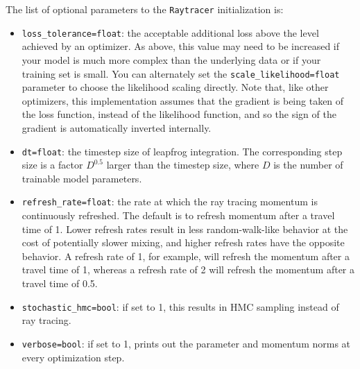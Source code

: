 \documentclass[12pt]{article}
\begin{document}
The list of optional parameters to the \lstinline{Raytracer} initialization is:
\begin{itemize}
\label{optional_parameters}
\item \lstinline{loss_tolerance=float}: the acceptable additional loss above the level achieved by an optimizer.  As above, this value may need to be increased if your model is much more complex than the underlying data or if your training set is small.  You can alternately set the \lstinline{scale_likelihood=float} parameter to choose the likelihood scaling directly.  Note that, like other optimizers, this implementation assumes that the gradient is being taken of the loss function, instead of the likelihood function, and so the sign of the gradient is automatically inverted internally.
\item \lstinline{dt=float}: the timestep size of leapfrog integration.  The corresponding step size is a factor $D^{0.5}$ larger than the timestep size, where $D$ is the number of trainable model parameters.
\item \lstinline{refresh_rate=float}: the rate at which the ray tracing momentum is continuously refreshed.  The default is to refresh momentum after a travel time of 1.  Lower refresh rates result in less random-walk-like behavior at the cost of potentially slower mixing, and higher refresh rates have the opposite behavior.  A refresh rate of 1, for example, will refresh the momentum after a travel time of 1, whereas a refresh rate of 2 will refresh the momentum after a travel time of 0.5.
\item \lstinline{stochastic_hmc=bool}: if set to 1, this results in HMC sampling instead of ray tracing.
\item \lstinline{verbose=bool}: if set to 1, prints out the parameter and momentum norms at every optimization step.\end{itemize}
\end{document}
